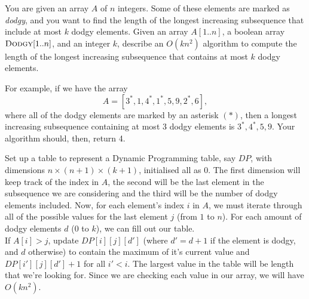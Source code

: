 \documentclass{article}
\begin{document}
\begin{question}
You are given an array $A$ of $n$ integers. Some of these elements are marked as {\em dodgy}, and you want to find the length of the longest increasing subsequence that include at most $k$ dodgy elements. Given an array $A[1..n]$, a boolean array $\mathsf{\textsc{Dodgy}}[1..n]$, and an integer $k$, describe an $O(kn^2)$ algorithm to compute the length of the longest increasing subsequence that contains at most $k$ dodgy elements.

For example, if we have the array \[A = [3^*, 1, 4^*, 1^*, 5, 9, 2^*, 6],\] where all of the dodgy elements are marked by an asterisk $(*)$, then a longest increasing subsequence containing at most 3 dodgy elements is $3^*, 4^*, 5, 9$. Your algorithm should, then, return 4.
\end{question}

\begin{solution}
Set up a table to represent a Dynamic Programming table, say $DP$, with dimensions $n \times (n + 1) \times (k + 1)$, initialised all as $0$. The first dimension will keep track of the index in $A$, the second will be the last element in the subsequence we are considering and the third will be the number of dodgy elements included. Now, for each element's index $i$ in $A$, we must iterate through all of the possible values for the last element $j$ (from $1$ to $n$). For each amount of dodgy elements $d$ ($0$ to $k$), we can fill out our table.\\

If $A[i] > j$, update $DP[i][j][d']$ (where $d' = d+1$ if the element is dodgy, and $d$ otherwise) to contain the maximum of it's current value and $DP[i'][j][d'] +1$ for all $i' < i$. The largest value in the table will be length that we're looking for. Since we are checking each value in our array, we will have $O(kn^2)$.

\end{solution}
\end{document}
